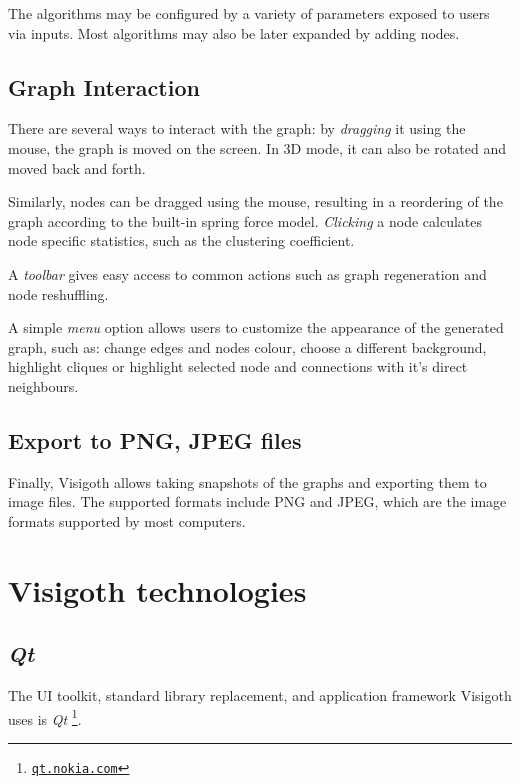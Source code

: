 \documentclass[a4paper,11pt,titlepage]{article}
\let\stdhref\href
\renewcommand{\href}[2]{\stdhref{#1}{\texttt{#2}}}
\let\stdsection\section         %
\renewcommand{\section}{\newpage\stdsection}
\newcommand{\buzz}[1]{\emph{#1}}
\newcommand{\myhref}[1]{\href{http://#1}{#1}}
\newcommand{\Qt}{\buzz{Qt} }
\begin{document}
The algorithms may be configured by a variety of parameters exposed to users
via inputs. Most algorithms may also be later expanded by adding nodes.

\subsection{Graph Interaction}
There are several ways to interact with the graph: by \emph{dragging} it using
the mouse, the graph is moved on the screen. In 3D mode, it can also be rotated
and moved back and forth.

Similarly, nodes can be dragged using the mouse, resulting in a reordering of
the graph according to the built-in spring force model. \emph{Clicking} a node
calculates node specific statistics, such as the clustering coefficient.

A \emph{toolbar} gives easy access to common actions such as graph regeneration
and node reshuffling.

A simple \emph{menu} option allows users to customize the appearance of the
generated graph, such as: change edges and nodes colour, choose a different
background, highlight cliques or highlight selected node and connections with
it's direct neighbours.

\subsection{Export to PNG, JPEG files}
Finally, Visigoth allows taking snapshots of the graphs and exporting them to
image files. The supported formats include PNG and JPEG, which are the image
formats supported by most computers.

\section{Visigoth technologies}

\subsection{\Qt}

The UI toolkit, standard library replacement, and application
framework Visigoth uses is \Qt\footnote{\myhref{qt.nokia.com}}.
\end{document}
